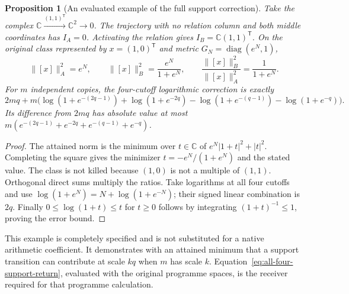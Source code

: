 \documentclass[11pt,a4paper]{article}
\newtheorem{proposition}[theorem]{Proposition}
\theoremstyle{definition}\newtheorem{definition}[theorem]{Definition}
\newcommand{\C}{\mathbb C}\newcommand{\R}{\mathbb R}
\begin{document}
\begin{proposition}[An evaluated example of the full support correction]\label{prop:evaluated-support-correction}
Take the complex $\C\xrightarrow{(1,1)^{\mathsf T}}\C^2\to0$. The trajectory with no relation column and both middle coordinates has $I_A=0$. Activating the relation gives $I_B=\C(1,1)^{\mathsf T}$. On the original class represented by $x=(1,0)^{\mathsf T}$ and metric $G_N=\operatorname{diag}(e^N,1)$,
\[
 \|[x]\|_A^2=e^N,\qquad
 \|[x]\|_B^2=\frac{e^N}{1+e^N},\qquad
 \frac{\|[x]\|_B^2}{\|[x]\|_A^2}=\frac1{1+e^N}.
\]
For $m$ independent copies, the four-cutoff logarithmic correction is exactly
\begin{equation}\label{eq:evaluated-four-cutoff-defect}
 2mq+m\bigl(\log(1+e^{-(2q-1)})+\log(1+e^{-2q})
 -\log(1+e^{-(q-1)})-\log(1+e^{-q})\bigr).
\end{equation}
Its difference from $2mq$ has absolute value at most
$m(e^{-(2q-1)}+e^{-2q}+e^{-(q-1)}+e^{-q})$.
\end{proposition}
\begin{proof}
The attained norm is the minimum over $t\in\C$ of $e^N|1+t|^2+|t|^2$. Completing the square gives the minimizer $t=-e^N/(1+e^N)$ and the stated value. The class is not killed because $(1,0)$ is not a multiple of $(1,1)$. Orthogonal direct sums multiply the ratios. Take logarithms at all four cutoffs and use $\log(1+e^N)=N+\log(1+e^{-N})$; their signed linear combination is $2q$. Finally $0\le\log(1+t)\le t$ for $t\ge0$ follows by integrating $(1+t)^{-1}\le1$, proving the error bound.
\end{proof}
This example is completely specified and is not substituted for a native arithmetic coefficient. It demonstrates with an attained minimum that a support transition can contribute at scale $kq$ when $m$ has scale $k$. Equation~\eqref{eq:all-four-support-return}, evaluated with the original programme spaces, is the receiver required for that programme calculation.

\end{document}
